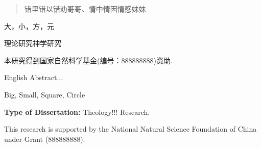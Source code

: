 \fancyhead[C]{\leftmark}
\fancyhead[CO]{\leftmark} %

\begin{abstract}
错里错以错劝哥哥、情中情因情感妹妹
\end{abstract}

\begin{keywords}
大，小，方，元
\end{keywords}

\vspace{\baselineskip} %
\noindent %
{}理论研究神学研究

\vspace{1.5\baselineskip} %
\noindent %
本研究得到国家自然科学基金(编号：888888888)资助.
\cleardoublepage


\fancyhead[C]{\leftmark}
\fancyhead[CO]{\leftmark} %

\begin{englishabstract}
English Abstract...
\end{englishabstract}

\begin{englishkeywords}
Big, Small, Square, Circle
\end{englishkeywords}

\vspace{\baselineskip} %
\noindent %
\textbf{Type of Dissertation: }Theology!!! Research.

\vspace{1.5\baselineskip} %
\noindent %
This research is supported by the National Natural Science Foundation of China under Grant (888888888).
\cleardoublepage
